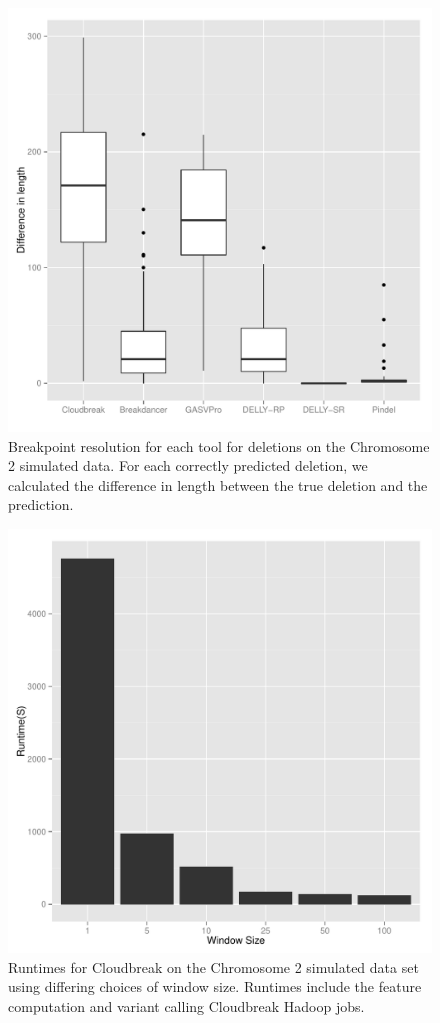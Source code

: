 \documentclass[11pt]{article}
\begin{document}
\begin{figure}
\centering
\includegraphics[width=1\textwidth]{breakpoint_resolution.pdf}
\caption{Breakpoint resolution for each tool for deletions on the Chromosome 2 simulated data. For each correctly predicted deletion, we calculated the difference in length between the true deletion and the prediction.}
\label{breakpoint_resolution}
\end{figure}

\clearpage

\begin{figure}
\centering
\includegraphics[width=.8\textwidth]{runtime_by_windowSize.pdf}
\caption[Cloudbreak runtimes with varying window sizes.]{Runtimes for Cloudbreak on the Chromosome 2 simulated data set using differing choices of window size. Runtimes include the feature computation and variant calling Cloudbreak Hadoop jobs.}
\label{figure_runtime_by_window_size}
\end{figure}
\end{document}

